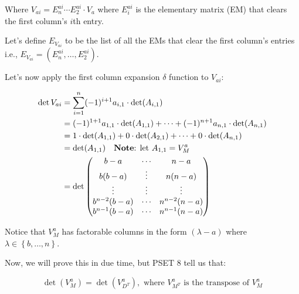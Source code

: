 \documentclass{report}
\begin{document}
{Where \(V_{ai} = E_{n}^{ai} \cdots E_{2}^{ai} \cdot V_{a}\) where \(E_{i}^{ai}\) is the elementary matrix (EM) that clears the first column's \(i\)th entry.

Let's define \(E_{V_{ai}}\) to be the list of all the EMs that clear the first column's entries i.e., \(E_{V_{ai}} = (E_{n}^{ai}, \ldots, E_{2}^{ai})\).

Let's now apply the first column expansion \(\delta\) function to \(V_{ai}\):

\begin{align*}
	\det V_{ai} & = \sum_{i=1}^n(-1)^{i+1} a_{i,1} \cdot \det(A_{i,1})                                                                                                                                                                  \\
	            & = (-1)^{1 + 1} a_{1, 1} \cdot \det(A_{1, 1}) + \cdots + (-1)^{n + 1} a_{n, 1} \cdot \det(A_{n, 1})                                                                                                                    \\
	            & =  1 \cdot \det(A_{1, 1}) + 0 \cdot \det(A_{2, 1}) + \cdots + 0 \cdot \det(A_{n, 1})                                                                                                                                  \\
	            & = \det(A_{1, 1}) \quad \text{\textbf{Note}: let \(A_{1, 1} = V^{a}_{M}\)}                                                                                                                                             \\
	            & = \det \begin{pmatrix} b - a & \cdots & n - a \\ b(b - a) & \vdots & n(n - a) \\ \vdots & \vdots & \vdots \\ b^{n - 2}(b - a) & \cdots & n^{n - 2}(n - a) \\ b^{n-1} (b - a) & \cdots & n^{n-1} (n - a) \end{pmatrix}
\end{align*}

Notice that \(V^{a}_{M}\) has factorable columns in the form \((\lambda - a)\) where \(\lambda \in \left\{ b, \ldots, n \right\}\).

Now, we will prove this in due time, but PSET 8 tell us that:

\[
	\det(V^{a}_{M}) = \det(V^{a}_{D^{T}}), \text{ where } V^{a}_{M^{T}} \text{ is the transpose of } V^{a}_{M}
\]

}
\end{document}

